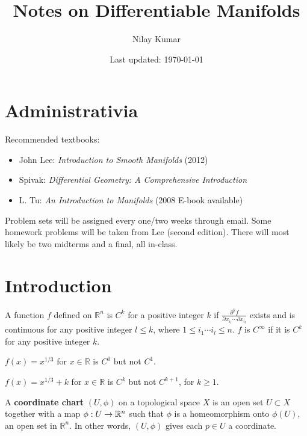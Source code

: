 \documentclass{mathnotes}
\title{Notes on Differentiable Manifolds}
\author{Nilay Kumar}
\date{Last updated: \today}
\begin{document}
\maketitle

\setcounter{section}{-1}

\section{Administrativia}

Recommended textbooks:
\begin{itemize}
    \item John Lee: \textit{Introduction to Smooth Manifolds} (2012)
    \item Spivak: \textit{Differential Geometry: A Comprehensive Introduction}
    \item L. Tu: \textit{An Introduction to Manifolds} (2008 E-book available)
\end{itemize}

Problem sets will be assigned every one/two weeks through email. Some homework problems will be taken from Lee (second edition).
There will most likely be two midterms and a final, all in-class.

\section{Introduction}

\begin{defn}
    A function $f$ defined on $\mathbb{R}^n$ is $C^k$ for a positive integer $k$ if $\frac{\partial^k f}{\partial x_{i_1}\cdots\partial x_{i_l}}$ 
    exists and is continuous for any positive integer $l\leq k$, where $1\leq i_1\cdots i_l\leq n$. $f$ is $C^\infty$ if it is $C^k$ for any positive
    integer $k$.
\end{defn}

\begin{exmp}
    $f(x)=x^{1/3}$ for $x\in\mathbb{R}$ is $C^0$ but not $C^1$.
\end{exmp}

\begin{exmp}
    $f(x)=x^{1/3}+k$ for $x\in\mathbb{R}$ is $C^k$ but not $C^{k+1}$, for $k\geq 1$.
\end{exmp}

\begin{defn}
    A \textbf{coordinate chart} $(U,\phi)$ on a topological space $X$ is an open set $U\subset X$ together with a map $\phi:U\rightarrow \mathbb{R}^n$
    such that $\phi$ is a homeomorphism onto $\phi(U)$, an open set in $\mathbb{R}^n$. In other words, $(U,\phi)$ gives each $p\in U$ a
    coordinate.
\end{defn}
\end{document}
